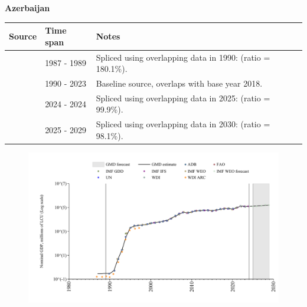 \documentclass[12pt,a4paper,landscape]{article}
\begin{document}
\begin{adjustbox}{max totalsize={\paperwidth}{\paperheight},center}
\begin{minipage}[t][\textheight][t]{\textwidth}
\vspace*{0.5cm}
{}
\begin{center}
{\Large\bfseries Azerbaijan}
\end{center}
\vspace{0.5cm}
\begin{table}[H]
\centering
\small
\begin{tabular}{|l|l|l|}
\hline
\textbf{Source} & \textbf{Time span} & \textbf{Notes} \\
\hline
\rowcolor{white}\cite{WDI_ARC}& 1987 - 1989 &Spliced using overlapping data in 1990: (ratio = 180.1\%).\\
\rowcolor{lightgray}\cite{WDI}& 1990 - 2023 &Baseline source, overlaps with base year 2018.\\
\rowcolor{white}\cite{IMF_IFS}& 2024 - 2024 &Spliced using overlapping data in 2025: (ratio = 99.9\%).\\
\rowcolor{lightgray}\cite{IMF_WEO_forecast}& 2025 - 2029 &Spliced using overlapping data in 2030: (ratio = 98.1\%).\\
\hline
\end{tabular}
\end{table}
\begin{figure}[H]
\centering
\includegraphics[width=\textwidth,height=0.6\textheight,keepaspectratio]{graphs/AZE_nGDP.pdf}
\end{figure}
\end{minipage}
\end{adjustbox}
\end{document}
